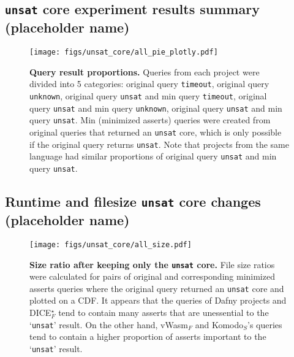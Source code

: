 \documentclass{article}
\newcommand{\unsat}{\texttt{unsat}\xspace}
\newcommand{\timeout}{\texttt{timeout}\xspace}
\newcommand{\unknown}{\texttt{unknown}\xspace}
\newcommand{\fsdice}{DICE$^\star_F$\xspace}
\newcommand{\fsvwasm}{vWasm$_F$\xspace}
\newcommand{\skomodo}{Komodo$_S$\xspace}
\begin{document}
\subsection{\unsat core experiment results summary (placeholder name)}

\begin{figure}[H]
    \begin{minipage}[c]{\textwidth}
      \texttt{[image: figs/unsat\_core/all\_pie\_plotly.pdf]}
      \vspace{-0.5cm}
      \caption{\textbf{Query result proportions.} Queries from each project were divided into 5 categories: original query \timeout, original query \unknown, original query \unsat and min query \timeout, original query \unsat and min query \unknown, original query \unsat and min query \unsat. Min (minimized asserts) queries were created from original queries that returned an \unsat core, which is only possible if the original query returns \unsat. Note that projects from the same language had similar proportions of original query \unsat and min query \unsat.
      }
      \label{fig:dkomodo_pert_ext}
      \vspace{0.5cm}
    \end{minipage}
\end{figure}

\clearpage

\subsection{Runtime and filesize \unsat core changes (placeholder name)}
\begin{figure}[H]
    \begin{minipage}[c]{\textwidth}
      \texttt{[image: figs/unsat\_core/all\_size.pdf]}
      \vspace{-0.5cm}
      \caption{\textbf{Size ratio after keeping only the \unsat core.} File size ratios were calculated for pairs of original and corresponding minimized asserts queries where the original query returned an \unsat core and plotted on a CDF. It appears that the queries of Dafny projects and \fsdice tend to contain many asserts that are unessential to the `\unsat' result. On the other hand, \fsvwasm and \skomodo's queries tend to contain a higher proportion of asserts important to the `\unsat' result.}
      \label{fig:unsat_core_all_size}
      \vspace{0.5cm}
    \end{minipage}
\end{figure}
\end{document}
